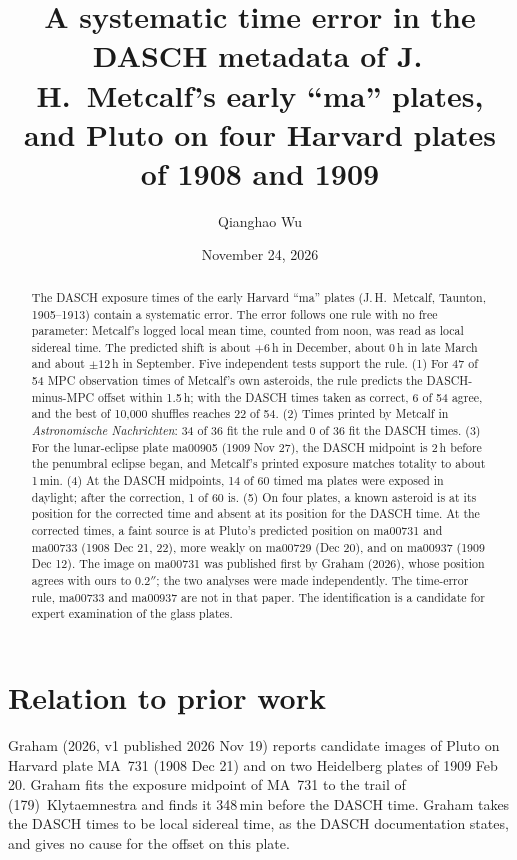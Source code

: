 \documentclass[11pt]{article}
\title{A systematic time error in the DASCH metadata of J.\,H.~Metcalf's early ``ma'' plates, and Pluto on four Harvard plates of 1908 and 1909}
\author{Qianghao Wu}
\date{November 24, 2026}
\begin{document}
\maketitle

\begin{abstract}
The DASCH exposure times of the early Harvard ``ma'' plates (J.\,H.~Metcalf, Taunton, 1905--1913) contain a systematic error. The error follows one rule with no free parameter: Metcalf's logged local mean time, counted from noon, was read as local sidereal time. The predicted shift is about $+6$\,h in December, about 0\,h in late March and about $\pm12$\,h in September. Five independent tests support the rule. (1) For 47 of 54 MPC observation times of Metcalf's own asteroids, the rule predicts the DASCH-minus-MPC offset within 1.5\,h; with the DASCH times taken as correct, 6 of 54 agree, and the best of 10{,}000 shuffles reaches 22 of 54. (2) Times printed by Metcalf in \emph{Astronomische Nachrichten}: 34 of 36 fit the rule and 0 of 36 fit the DASCH times. (3) For the lunar-eclipse plate ma00905 (1909 Nov 27), the DASCH midpoint is 2\,h before the penumbral eclipse began, and Metcalf's printed exposure matches totality to about 1\,min. (4) At the DASCH midpoints, 14 of 60 timed ma plates were exposed in daylight; after the correction, 1 of 60 is. (5) On four plates, a known asteroid is at its position for the corrected time and absent at its position for the DASCH time.
At the corrected times, a faint source is at Pluto's predicted position on ma00731 and ma00733 (1908 Dec 21, 22), more weakly on ma00729 (Dec 20), and on ma00937 (1909 Dec 12). The image on ma00731 was published first by Graham (2026), whose position agrees with ours to $0.2''$; the two analyses were made independently. The time-error rule, ma00733 and ma00937 are not in that paper. The identification is a candidate for expert examination of the glass plates.
\end{abstract}

\section{Relation to prior work}
Graham (2026, v1 published 2026 Nov 19) reports candidate images of Pluto on Harvard plate MA~731 (1908 Dec 21) and on two Heidelberg plates of 1909 Feb 20. Graham fits the exposure midpoint of MA~731 to the trail of (179)~Klytaemnestra and finds it 348\,min before the DASCH time. Graham takes the DASCH times to be local sidereal time, as the DASCH documentation states, and gives no cause for the offset on this plate.
\end{document}
